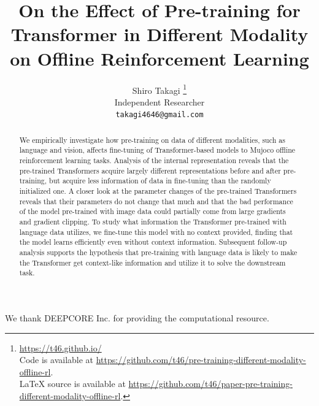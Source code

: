 \documentclass{article}
\title{On the Effect of Pre-training for Transformer in Different Modality on Offline Reinforcement Learning}
\author{
  Shiro Takagi \thanks{
  \href{https://t46.github.io/}{https://t46.github.io/}\\
  \hspace*{1.5em}
  Code is available at 
  \href{https://github.com/t46/pre-training-different-modality-offline-rl}{https://github.com/t46/pre-training-different-modality-offline-rl}.\\
  \hspace*{1.5em}
  LaTeX source is available at 
  \href{https://github.com/t46/paper-pre-training-different-modality-offline-rl}{https://github.com/t46/paper-pre-training-different-modality-offline-rl}.
  } \\
  Independent Researcher \\
  \texttt{takagi4646@gmail.com}
}
\begin{document}
\doparttoc %
\faketableofcontents %



\maketitle


\begin{abstract}
  We empirically investigate how pre-training on data of different modalities, such as language and vision, affects fine-tuning of Transformer-based models to Mujoco offline reinforcement learning tasks. Analysis of the internal representation reveals that the pre-trained Transformers acquire largely different representations before and after pre-training, but acquire less information of data in fine-tuning than the randomly initialized one. A closer look at the parameter changes of the pre-trained Transformers reveals that their parameters do not change that much and that the bad performance of the model pre-trained with image data could partially come from large gradients and gradient clipping. To study what information the Transformer pre-trained with language data utilizes, we fine-tune this model with no context provided, finding that the model learns efficiently even without context information. Subsequent follow-up analysis supports the hypothesis that pre-training with language data is likely to make the Transformer get context-like information and utilize it to solve the downstream task.
\end{abstract}








\begin{ack}
We thank DEEPCORE Inc. for providing the computational resource.
\end{ack}



\end{document}
